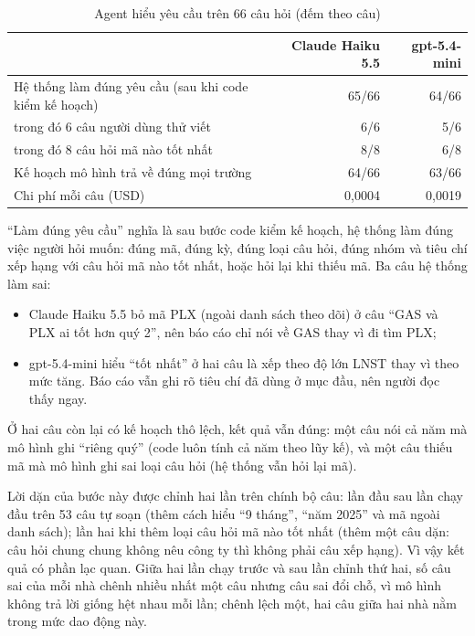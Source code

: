\documentclass[12pt,a4paper]{report}
\newcommand{\enquote}[1]{“#1”}
\begin{document}
\begin{table}[H]
\centering\small
\caption{Agent hiểu yêu cầu trên 66 câu hỏi (đếm theo câu)}\label{tab:agent-plan}
\begin{tabularx}{\linewidth}{@{}Xrr@{}}
\toprule
& \textbf{Claude Haiku 5.5} & \textbf{gpt-5.4-mini} \\ \midrule
Hệ thống làm đúng yêu cầu (sau khi code kiểm kế hoạch) & 65/66 & 64/66 \\
\quad trong đó 6 câu người dùng thử viết & 6/6 & 5/6 \\
\quad trong đó 8 câu hỏi mã nào tốt nhất & 8/8 & 6/8 \\
Kế hoạch mô hình trả về đúng mọi trường & 64/66 & 63/66 \\
Chi phí mỗi câu (USD) & 0,0004 & 0,0019 \\
\bottomrule
\end{tabularx}
\end{table}

\enquote{Làm đúng yêu cầu} nghĩa là sau bước code kiểm kế hoạch, hệ thống làm đúng việc người hỏi muốn: đúng mã, đúng
kỳ, đúng loại câu hỏi, đúng nhóm và tiêu chí xếp hạng với câu hỏi mã nào tốt nhất, hoặc hỏi lại khi thiếu mã. Ba câu
hệ thống làm sai:
\begin{itemize}
  \item Claude Haiku 5.5 bỏ mã PLX (ngoài danh sách theo dõi) ở câu \enquote{GAS và PLX ai tốt hơn quý 2}, nên báo cáo chỉ
        nói về GAS thay vì đi tìm PLX;
  \item gpt-5.4-mini hiểu \enquote{tốt nhất} ở hai câu là xếp theo độ lớn LNST thay vì theo mức tăng. Báo cáo vẫn ghi
        rõ tiêu chí đã dùng ở mục đầu, nên người đọc thấy ngay.
\end{itemize}
Ở hai câu còn lại có kế hoạch thô lệch, kết quả vẫn đúng: một câu nói cả năm mà mô hình ghi \enquote{riêng quý} (code
luôn tính cả năm theo lũy kế), và một câu thiếu mã mà mô hình ghi sai loại câu hỏi (hệ thống vẫn hỏi lại mã).

Lời dặn của bước này được chỉnh hai lần trên chính bộ câu: lần đầu sau lần chạy đầu trên 53 câu tự soạn (thêm cách hiểu
\enquote{9 tháng}, \enquote{năm 2025} và mã ngoài danh sách); lần hai khi thêm loại câu hỏi mã nào tốt nhất (thêm một
câu dặn: câu hỏi chung chung không nêu công ty thì không phải câu xếp hạng). Vì vậy kết quả có phần lạc quan. Giữa hai
lần chạy trước và sau lần chỉnh thứ hai, số câu sai của mỗi nhà chênh nhiều nhất một câu nhưng câu sai đổi chỗ, vì mô hình không
trả lời giống hệt nhau mỗi lần; chênh lệch một, hai câu giữa hai nhà nằm trong mức dao động này.
\end{document}
